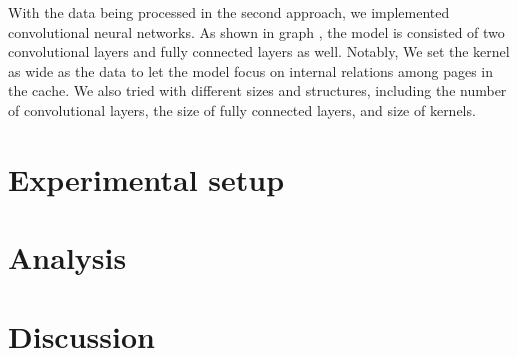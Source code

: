\documentclass[letterpaper,twocolumn,10pt]{article}
\begin{document}
With the data being processed in the second approach, we implemented convolutional neural networks. As shown in graph , the model is consisted of two convolutional layers and fully connected layers as well. Notably, We set the kernel as wide as the data to let the model focus on internal relations among pages in the cache. We also tried with different sizes and structures, including the number of convolutional layers, the size of fully connected layers, and size of kernels.




















\section{Experimental setup }



\section{Analysis}

\section{Discussion}



\end{document}
